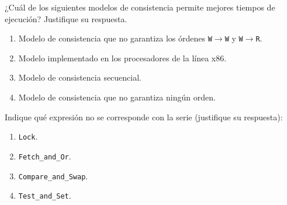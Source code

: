 \begin{cuestion}
    ¿Cuál de los siguientes modelos de consistencia permite mejores tiempos de ejecución?
    Justifique su respuesta.
    \begin{enumerate}
        \item Modelo de consistencia que no garantiza los órdenes \verb|W|$\to$\verb|W| y \verb|W|$\to$\verb|R|.
        \item Modelo implementado en los procesadores de la línea x86.
        \item Modelo de consistencia secuencial.
        \item Modelo de consistencia que no garantiza ningún orden.
    \end{enumerate}
\end{cuestion}

\begin{cuestion}
    Indique qué expresión no se corresponde con la serie (justifique su respuesta):
    \begin{enumerate}
        \item \verb|Lock|.
        \item \verb|Fetch_and_Or|.
        \item \verb|Compare_and_Swap|.
        \item \verb|Test_and_Set|.
    \end{enumerate}
\end{cuestion}